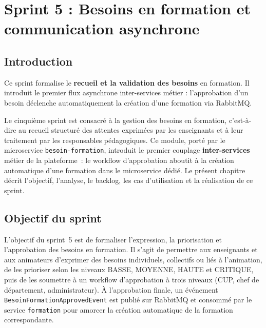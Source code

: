\documentclass[12pt,a4paper]{report}
\begin{document}
\clearpage
\chapter{Sprint 5 : Besoins en formation et communication asynchrone}

\section{Introduction}

\begin{summaryframe}[frametitle={En bref — Sprint 5}]
Ce sprint formalise le \textbf{recueil et la validation des besoins} en formation.
Il introduit le premier flux asynchrone inter-services métier : l'approbation
d'un besoin déclenche automatiquement la création d'une formation via RabbitMQ.
\end{summaryframe}

Le cinquième sprint est consacré à la gestion des besoins en formation, c'est-à-dire
au recueil structuré des attentes exprimées par les enseignants et à leur traitement
par les responsables pédagogiques. Ce module, porté par le microservice
\texttt{besoin-formation}, introduit le premier couplage \textbf{inter-services}
métier de la plateforme~: le workflow d'approbation aboutit à la création
automatique d'une formation dans le microservice dédié. Le présent chapitre décrit l'objectif, l'analyse, le
backlog, les cas d'utilisation et la réalisation de ce sprint.

\section{Objectif du sprint}

L'objectif du sprint~5 est de formaliser l'expression, la priorisation et
l'approbation des besoins en formation. Il s'agit de permettre aux enseignants et
aux animateurs d'exprimer des besoins individuels, collectifs ou liés à
l'animation, de les prioriser selon les niveaux BASSE, MOYENNE, HAUTE et CRITIQUE,
puis de les soumettre à un workflow d'approbation à trois niveaux (CUP, chef de
département, administrateur). À l'approbation finale, un événement
\texttt{BesoinFormationApprovedEvent} est publié sur RabbitMQ et consommé par le
service \texttt{formation} pour amorcer la création automatique de la formation
correspondante.
\end{document}
